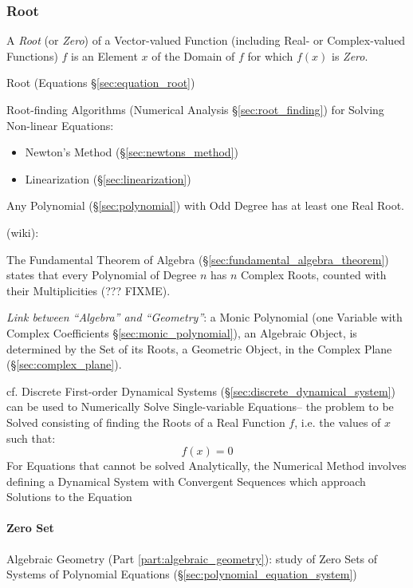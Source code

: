 \subsubsection{Root}\label{sec:function_root}

A \emph{Root} (or \emph{Zero}) of a Vector-valued Function (including Real- or
Complex-valued Functions) $f$ is an Element $x$ of the Domain of $f$ for which
$f(x)$ is \emph{Zero}.

\fist Root (Equations \S\ref{sec:equation_root})

\fist Root-finding Algorithms (Numerical Analysis \S\ref{sec:root_finding}) for
Solving Non-linear Equations:
\begin{itemize}
  \item Newton's Method (\S\ref{sec:newtons_method})
  \item Linearization (\S\ref{sec:linearization})
\end{itemize}

Any Polynomial (\S\ref{sec:polynomial}) with Odd Degree has at least
one Real Root.

(wiki):

The Fundamental Theorem of Algebra (\S\ref{sec:fundamental_algebra_theorem})
states that every Polynomial of Degree $n$ has $n$ Complex Roots, counted with
their Multiplicities (??? FIXME).

\emph{Link between ``Algebra'' and ``Geometry''}: a Monic Polynomial (one
Variable with Complex Coefficients \S\ref{sec:monic_polynomial}), an Algebraic
Object, is determined by the Set of its Roots, a Geometric Object, in the
Complex Plane (\S\ref{sec:complex_plane}).

\asterism

\fist cf. Discrete First-order Dynamical Systems
(\S\ref{sec:discrete_dynamical_system}) can be used to Numerically Solve
Single-variable Equations-- the problem to be Solved consisting of finding the
Roots of a Real Function $f$, i.e. the values of $x$ such that:
\[
  f(x) = 0
\]
For Equations that cannot be solved Analytically, the Numerical Method involves
defining a Dynamical System with Convergent Sequences which approach Solutions
to the Equation



\paragraph{Zero Set}\label{sec:zero_set}\hfill

\fist Algebraic Geometry (Part \ref{part:algebraic_geometry}): study of Zero
Sets of Systems of Polynomial Equations
(\S\ref{sec:polynomial_equation_system})

